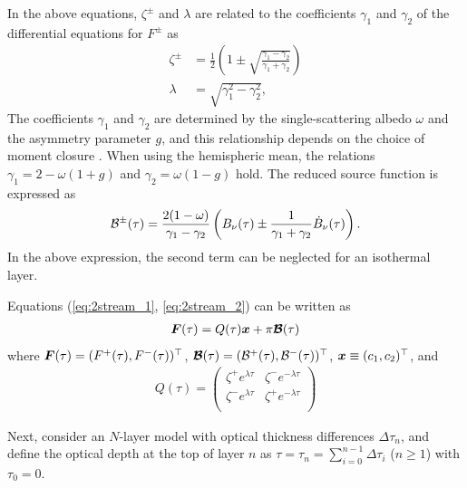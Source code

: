 In the above equations, $\zeta^{\pm}$ and $\lambda$ are related to the coefficients $\gamma_1$ and $\gamma_2$ of the differential equations for $F^{\pm}$ as
\begin{align}
    \zeta^\pm &= \frac{1}{2} \left( 1 \pm \sqrt{\frac{\gamma_1 - \gamma_2}{\gamma_1 + \gamma_2}} \right)\\
    \lambda &= \sqrt{\gamma_1^2 - \gamma_2^2},
\end{align}
The coefficients $\gamma_1$ and $\gamma_2$ are determined by the single-scattering albedo $\omega$ and the asymmetry parameter $g$, and this relationship depends on the choice of moment closure \cite{1989JGR....9416287T}. When using the hemispheric mean,
the relations $\gamma_1 = 2 - \omega (1 + g)$ and $\gamma_2 = \omega (1 - g)$ hold. The reduced source function is expressed as
\begin{align}
\mathcal{B}^\pm (\tau) = 
    \frac{ 2 (1-\omega)}{\gamma_1 - \gamma_2} \left( B_\nu(\tau) \pm \frac{1}{\gamma_1 + \gamma_2} \dot{B}_\nu (\tau) \right).
\end{align}
In the above expression, the second term can be neglected for an isothermal layer.

Equations (\ref{eq:2stream_1}, \ref{eq:2stream_2}) can be written as
\begin{align}
    \boldsymbol{F}(\tau) = Q(\tau) \boldsymbol{x} + \pi \boldsymbol{\mathcal{B}} (\tau)
\end{align}
where $\boldsymbol{F} (\tau) = (F^+ (\tau), F^-(\tau))^\top$, $\boldsymbol{\mathcal{B}} (\tau) = (\mathcal{B}^+ (\tau), \mathcal{B}^- (\tau))^\top$, $\boldsymbol{x} \equiv (c_1, c_2)^\top$, and
\begin{align}
    Q(\tau) = \left(
\begin{array}{cc}
\zeta^+ e^{\lambda \tau} & \zeta^- e^{-\lambda \tau}  \\
\zeta^- e^{\lambda \tau} & \zeta^+ e^{-\lambda \tau}  \\
\end{array}
\right)
\end{align}

Next, consider an $N$-layer model with optical thickness differences $\Delta \tau_n$, and define the optical depth at the top of layer $n$ as $\tau = \tau_n = \sum_{i=0}^{n-1} \Delta \tau_i$ ($n \ge 1$) with $\tau_0 = 0$.

